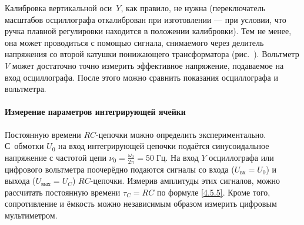 Калибровка вертикальной оси~$Y$, как правило, не нужна
(переключатель масштабов осциллографа откалиброван при изготовлении ---
при условии, что ручка плавной регулировки находится в положении
калибровки). Тем не менее, она может проводиться с помощью сигнала,
снимаемого через делитель напряжения со второй катушки понижающего трансформатора
(рис.~). Вольтметр $V$ может достаточно точно
измерить эффективное напряжение, подаваемое на вход осциллографа. После
этого можно сравнить показания осциллографа и вольтметра.

\paragraph{Измерение параметров интегрирующей ячейки}
Постоянную времени $RC$-цепочки можно определить экспериментально.
С~обмотки $U_0$ на вход интегрирующей цепочки подаётся синусоидальное напряжение
с частотой цепи $\nu_0=\frac{\omega_0}{2\pi}=50\;Гц$.
На вход $Y$ осциллографа или цифрового вольтметра поочерёдно
подаются сигналы со входа ($U_\text{вх}=U_0$) и выхода ($U_\text{вых} = U_C$)
$RC$-цепочки. Измерив амплитуды этих сигналов, можно рассчитать постоянную
времени $\tau_C= RC$ по формуле \eqref{4.5.5}.
Кроме того, сопротивление и ёмкость можно независимым образом измерить
цифровым мультиметром.

